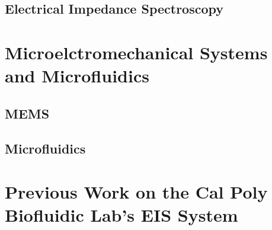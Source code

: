  
 
 \subsection{Electrical Impedance Spectroscopy}
 
 
 
 
 \section{Microelctromechanical Systems and Microfluidics}
 
 \subsection{MEMS}
 
 
 \subsection{Microfluidics}
 
 
 \section{Previous Work on the Cal Poly Biofluidic Lab's EIS System}
 
